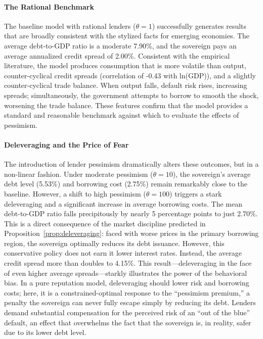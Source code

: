 \documentclass[12pt]{article}
\theoremstyle{plain}
\begin{document}
\paragraph{The Rational Benchmark}
The baseline model with rational lenders ($\theta=1$) successfully generates
results that are broadly consistent with the stylized facts for emerging
economies. The average debt-to-GDP ratio is a moderate 7.90\%, and the
sovereign pays an average annualized credit spread of 2.00\%. Consistent with
the empirical literature, the model produces consumption that is more volatile
than output, counter-cyclical credit spreads (correlation of -0.43 with
ln(GDP)), and a slightly counter-cyclical trade balance. When output falls,
default risk rises, increasing spreads; simultaneously, the government attempts
to borrow to smooth the shock, worsening the trade balance. These features
confirm that the model provides a standard and reasonable benchmark against
which to evaluate the effects of pessimism.

\paragraph{Deleveraging and the Price of Fear}
The introduction of lender pessimism dramatically alters these outcomes, but in
a non-linear fashion. Under moderate pessimism ($\theta=10$), the sovereign's
average debt level (5.53\%) and borrowing cost (2.75\%) remain remarkably close
to the baseline. However, a shift to high pessimism ($\theta=100$) triggers a
stark deleveraging and a significant increase in average borrowing costs. The
mean debt-to-GDP ratio falls precipitously by nearly 5 percentage points to
just 2.70\%. This is a direct consequence of the market discipline predicted in
Proposition~\ref{prop:deleveraging}: faced with worse prices in the primary
borrowing region, the sovereign optimally reduces its debt issuance. However,
this conservative policy does not earn it lower interest rates. Instead, the
average credit spread more than doubles to 4.15\%. This result---deleveraging
in the face of even higher average spreads—starkly illustrates the power of the
behavioral bias. In a pure reputation model, deleveraging should lower risk and
borrowing costs; here, it is a constrained-optimal response to the ``pessimism
premium,'' a penalty the sovereign can never fully escape simply by reducing
its debt. Lenders demand substantial compensation for the perceived risk of an
``out of the blue'' default, an effect that overwhelms the fact that the
sovereign is, in reality, safer due to its lower debt level.
\end{document}
